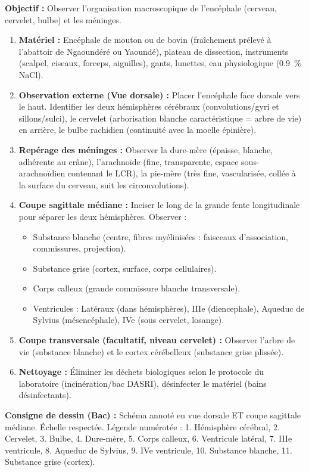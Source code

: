 \documentclass[11pt]{article}
\begin{document}
\begin{methode}
\textbf{Objectif :} Observer l'organisation macroscopique de l'encéphale (cerveau, cervelet, bulbe) et les méninges.
\begin{enumerate}
    \item \textbf{Matériel :} Encéphale de mouton ou de bovin (fraîchement prélevé à l'abattoir de Ngaoundéré ou Yaoundé), plateau de dissection, instruments (scalpel, ciseaux, forceps, aiguilles), gants, lunettes, eau physiologique (\SI{0,9}{\%} NaCl).
    \item \textbf{Observation externe (Vue dorsale) :} Placer l'encéphale face dorsale vers le haut. Identifier les deux hémisphères cérébraux (convolutions/gyri et sillons/sulci), le cervelet (arborisation blanche caractéristique = arbre de vie) en arrière, le bulbe rachidien (continuité avec la moelle épinière).
    \item \textbf{Repérage des méninges :} Observer la dure-mère (épaisse, blanche, adhérente au crâne), l'arachnoïde (fine, transparente, espace sous-arachnoïdien contenant le LCR), la pie-mère (très fine, vascularisée, collée à la surface du cerveau, suit les circonvolutions).
    \item \textbf{Coupe sagittale médiane :} Inciser le long de la grande fente longitudinale pour séparer les deux hémisphères. Observer :
    \begin{itemize}
        \item Substance blanche (centre, fibres myélinisées : faisceaux d'association, commissures, projection).
        \item Substance grise (cortex, surface, corps cellulaires).
        \item Corps calleux (grande commissure blanche transversale).
        \item Ventricules : Latéraux (dans hémisphères), IIIe (diencephale), Aqueduc de Sylvius (mésencéphale), IVe (sous cervelet, losange).
    \end{itemize}
    \item \textbf{Coupe transversale (facultatif, niveau cervelet) :} Observer l'arbre de vie (substance blanche) et le cortex cérébelleux (substance grise plissée).
    \item \textbf{Nettoyage :} Éliminer les déchets biologiques selon le protocole du laboratoire (incinération/bac DASRI), désinfecter le matériel (bains désinfectants).
\end{enumerate}
\textbf{Consigne de dessin (Bac) :} Schéma annoté en vue dorsale ET coupe sagittale médiane. Échelle respectée. Légende numérotée : 1. Hémisphère cérébral, 2. Cervelet, 3. Bulbe, 4. Dure-mère, 5. Corps calleux, 6. Ventricule latéral, 7. IIIe ventricule, 8. Aqueduc de Sylvius, 9. IVe ventricule, 10. Substance blanche, 11. Substance grise (cortex).
\end{methode}
\end{document}
